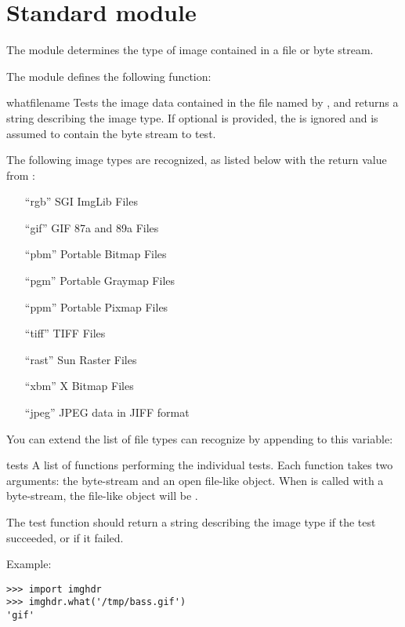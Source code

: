 \section{Standard module }

The  module determines the type of image contained in a
file or byte stream.

The  module defines the following function:

\renewcommand{\indexsubitem}{(in module imghdr)}

\begin{funcdesc}{what}{filename}
Tests the image data contained in the file named by ,
and returns a string describing the image type.  If optional 
is provided, the  is ignored and  is assumed to
contain the byte stream to test.
\end{funcdesc}

The following image types are recognized, as listed below with the
return value from :

\begin{enumerate}
\item[``rgb''] SGI ImgLib Files

\item[``gif''] GIF 87a and 89a Files

\item[``pbm''] Portable Bitmap Files

\item[``pgm''] Portable Graymap Files

\item[``ppm''] Portable Pixmap Files

\item[``tiff''] TIFF Files

\item[``rast''] Sun Raster Files

\item[``xbm''] X Bitmap Files

\item[``jpeg''] JPEG data in JIFF format
\end{enumerate}

You can extend the list of file types  can recognize by
appending to this variable:

\begin{datadesc}{tests}
A list of functions performing the individual tests.  Each function
takes two arguments: the byte-stream and an open file-like object.
When  is called with a byte-stream, the file-like
object will be .

The test function should return a string describing the image type if
the test succeeded, or  if it failed.
\end{datadesc}

Example:

\begin{verbatim}
>>> import imghdr
>>> imghdr.what('/tmp/bass.gif')
'gif'
\end{verbatim}
